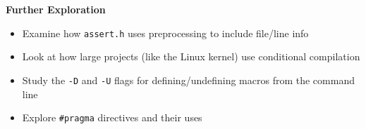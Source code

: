 \begin{experiment}
\textbf{Further Exploration}

\begin{itemize}
    \item Examine how \texttt{assert.h} uses preprocessing to include file/line info
    \item Look at how large projects (like the Linux kernel) use conditional compilation
    \item Study the \texttt{-D} and \texttt{-U} flags for defining/undefining macros from the command line
    \item Explore \texttt{\#pragma} directives and their uses
\end{itemize}

\end{experiment}
